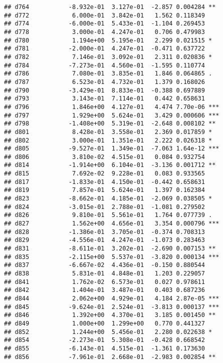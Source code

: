 \documentclass[
]{article}
\begin{document}
\begin{verbatim}
## d764           -8.932e-01  3.127e-01  -2.857 0.004284 ** 
## d772            6.000e-01  3.842e-01   1.562 0.118349    
## d774           -6.000e-01  5.433e-01  -1.104 0.269453    
## d778            3.000e-01  4.247e-01   0.706 0.479983    
## d780            1.194e+00  5.195e-01   2.299 0.021515 *  
## d781           -2.000e-01  4.247e-01  -0.471 0.637722    
## d782            7.146e-01  3.092e-01   2.311 0.020836 *  
## d784           -7.273e-01  4.560e-01  -1.595 0.110774    
## d786            7.080e-01  3.835e-01   1.846 0.064865 .  
## d787            6.523e-01  4.732e-01   1.379 0.168026    
## d790           -3.429e-01  8.833e-01  -0.388 0.697889    
## d793            3.143e-01  7.114e-01   0.442 0.658631    
## d796            1.846e+00  4.127e-01   4.474 7.70e-06 ***
## d797            1.929e+00  5.624e-01   3.429 0.000606 ***
## d798           -1.408e+00  5.319e-01  -2.648 0.008102 ** 
## d801            8.428e-01  3.558e-01   2.369 0.017859 *  
## d802            3.000e-01  1.351e-01   2.222 0.026318 *  
## d805           -9.527e-01  1.349e-01  -7.063 1.64e-12 ***
## d806            3.810e-02  4.515e-01   0.084 0.932754    
## d814           -1.914e+00  6.104e-01  -3.136 0.001712 ** 
## d815            7.692e-02  9.228e-01   0.083 0.933565    
## d817           -1.833e-01  4.150e-01  -0.442 0.658631    
## d819            7.857e-01  5.624e-01   1.397 0.162384    
## d823           -8.662e-01  4.185e-01  -2.069 0.038505 *  
## d824           -3.015e-01  2.788e-01  -1.081 0.279502    
## d826            9.810e-01  5.561e-01   1.764 0.077739 .  
## d827            1.562e+00  4.656e-01   3.354 0.000796 ***
## d828           -1.386e-01  3.705e-01  -0.374 0.708313    
## d829           -4.556e-01  4.247e-01  -1.073 0.283463    
## d831           -8.611e-01  3.202e-01  -2.690 0.007153 ** 
## d835           -2.115e+00  5.537e-01  -3.820 0.000134 ***
## d837           -6.667e-02  4.436e-01  -0.150 0.880544    
## d838            5.831e-01  4.848e-01   1.203 0.229057    
## d841            1.762e-02  6.573e-01   0.027 0.978611    
## d842            1.404e-01  3.487e-01   0.403 0.687236    
## d844            2.062e+00  4.929e-01   4.184 2.87e-05 ***
## d845           -9.624e-01  2.524e-01  -3.813 0.000137 ***
## d846            1.392e+00  4.370e-01   3.185 0.001450 ** 
## d849            1.000e+00  1.299e+00   0.770 0.441327    
## d852            1.244e+00  5.456e-01   2.280 0.022638 *  
## d854           -2.273e-01  5.308e-01  -0.428 0.668542    
## d855           -6.143e-01  4.515e-01  -1.361 0.173630    
## d856           -7.961e-01  2.668e-01  -2.983 0.002854 ** 

\end{verbatim}
\end{document}
